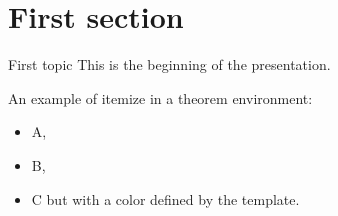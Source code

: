 \documentclass{beamer}
\begin{document}
\section{First section}
\sectionpage

\begin{frame}{First topic}
    This is the beginning of the presentation.
    \begin{theorem}[Example]
    	An example of itemize in a theorem environment:
    	\begin{itemize}
    		\item A,
    		\item B,
    		\item \color{giallo} C but with a color defined by the template.
    	\end{itemize}
    \end{theorem}
\end{frame}
\end{document}
